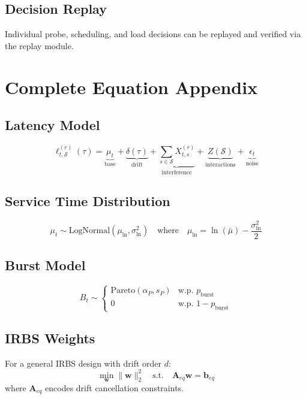 \documentclass[11pt,twocolumn]{article}
\begin{document}
\subsection{Decision Replay}
Individual probe, scheduling, and load decisions can be replayed
and verified via the replay module.

\section{Complete Equation Appendix}

\subsection{Latency Model}
\begin{equation}
\ell_{t,\mathcal{S}}^{(r)}(\tau) = \underbrace{\mu_t}_{\text{base}} + \underbrace{\delta(\tau)}_{\text{drift}} + \underbrace{\sum_{s \in \mathcal{S}} X_{t,s}^{(r)}}_{\text{interference}} + \underbrace{Z(\mathcal{S})}_{\text{interactions}} + \underbrace{\epsilon_t}_{\text{noise}}
\end{equation}

\subsection{Service Time Distribution}
\begin{equation}
\mu_t \sim \text{LogNormal}(\mu_{\ln}, \sigma_{\ln}^2)
\quad \text{where} \quad
\mu_{\ln} = \ln(\bar{\mu}) - \frac{\sigma_{\ln}^2}{2}
\end{equation}

\subsection{Burst Model}
\begin{equation}
B_t \sim \begin{cases}
\text{Pareto}(\alpha_P, s_P) & \text{w.p. } p_{\text{burst}} \\
0 & \text{w.p. } 1 - p_{\text{burst}}
\end{cases}
\end{equation}

\subsection{IRBS Weights}
For a general IRBS design with drift order $d$:
\begin{equation}
\min_{\mathbf{w}} \|\mathbf{w}\|_2^2 \quad \text{s.t.} \quad
\mathbf{A}_{eq} \mathbf{w} = \mathbf{b}_{eq}
\end{equation}
where $\mathbf{A}_{eq}$ encodes drift cancellation constraints.
\end{document}
